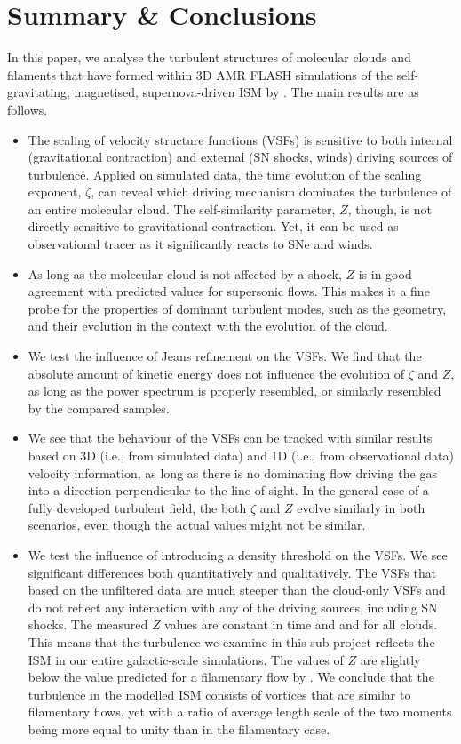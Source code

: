 \section{Summary \& Conclusions}\label{conclusions}

In this paper, we analyse the turbulent structures of molecular clouds and filaments that have formed within 3D AMR FLASH simulations of the self-gravitating, magnetised, supernova-driven ISM by \citet{IbanezMejia2016}.
The main results are as follows.

\begin{itemize}
	\item The scaling of velocity structure functions (VSFs) is sensitive to both internal (gravitational contraction) and external (SN shocks, winds) driving sources of turbulence. Applied on simulated data, the time evolution of the scaling exponent, $\zeta$, can reveal which driving mechanism dominates the turbulence of an entire molecular cloud. The self-similarity parameter, $Z$, though, is not directly sensitive to gravitational contraction. Yet, it can be used as observational tracer as it significantly reacts to SNe and winds.
	\item As long as the molecular cloud is not affected by a shock, $Z$ is in good agreement with predicted values for supersonic flows. This makes it a fine probe for the properties of dominant turbulent modes, such as the geometry, and their evolution in the context with the evolution of the cloud. 
	\item We test the influence of Jeans refinement on the VSFs. We find that the absolute amount of kinetic energy does not influence the evolution of $\zeta$ and $Z$, as long as the power spectrum is properly resembled, or similarly resembled by the compared samples.
	\item We see that the behaviour of the VSFs can be tracked with similar results based on 3D (i.e., from simulated data) and 1D (i.e., from observational data) velocity information, as long as there is no dominating flow driving the gas into a direction perpendicular to the line of sight. In the general case of a fully developed turbulent field, the both $\zeta$ and $Z$ evolve similarly in both scenarios, even though the actual values might not be similar.
	\item We test the influence of introducing a density threshold on the VSFs. We see significant differences both quantitatively and qualitatively. The VSFs that based on the unfiltered data are much steeper than the cloud-only VSFs and do not reflect any interaction with any of the driving sources, including SN shocks. The measured $Z$ values are constant in time and and for all clouds. This means that the turbulence we examine in this sub-project reflects the ISM in our entire galactic-scale simulations. The values of $Z$ are slightly below the value predicted for a filamentary flow by \citet{She1997}. We conclude that the turbulence in the modelled ISM consists of vortices that are similar to filamentary flows, yet with a ratio of average length scale of the two moments being more equal to unity than in the filamentary case.

\end{itemize}
